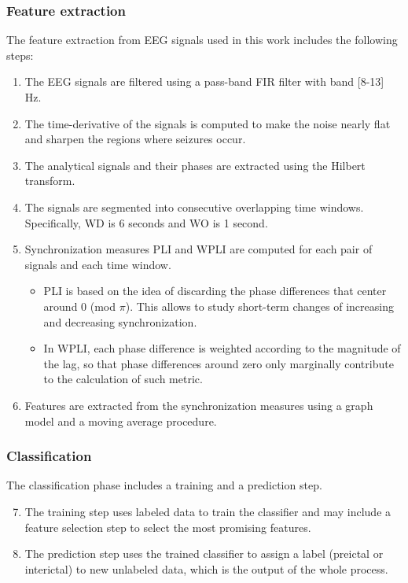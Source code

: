 \subsubsection{Feature extraction}
The feature extraction from \gls{EEG} signals used in this work includes the following steps:
\begin{enumerate}
    \item The \gls{EEG} signals are filtered using a pass-band \gls{FIR} filter with band [8-13] \unit{Hz}.
    \item The time-derivative of the signals is computed to make the noise nearly flat and sharpen the regions where seizures occur.
    \item The analytical signals and their phases are extracted using the Hilbert transform.
    \item The signals are segmented into consecutive overlapping time windows. 
    Specifically, \gls{WD} is 6 seconds and \gls{WO} is 1 second.
    \item Synchronization measures \gls{PLI} and \gls{WPLI} are computed for each pair of signals and each time window.
        \begin{itemize}
            \item \gls{PLI} is based on the idea of discarding the phase differences that center around 0 (mod $\pi$). This allows to study short-term changes of increasing and decreasing synchronization.
            \item In \gls{WPLI}, each phase difference is weighted according to the magnitude of the lag, so that phase differences around zero only marginally contribute to the calculation of such metric.
        \end{itemize}
    \item Features are extracted from the synchronization measures using a graph model and a moving average procedure.
\end{enumerate}

\subsubsection{Classification}
The classification phase includes a training and a prediction step. 
\begin{enumerate}
    \setcounter{enumi}{6}
    \item The training step uses labeled data to train the classifier and may include a feature selection step to select the most promising features.
    \item The prediction step uses the trained classifier to assign a label (preictal or interictal) to new unlabeled data, which is the output of the whole process.
\end{enumerate}

